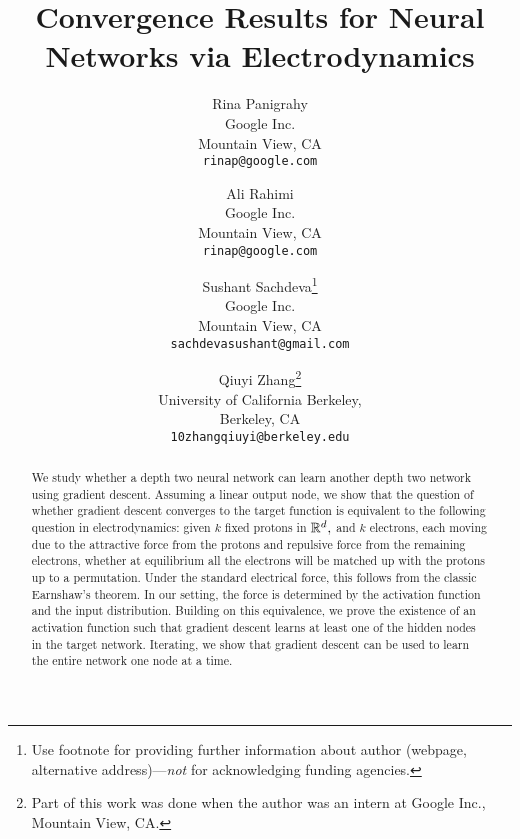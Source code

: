 \documentclass[11pt]{article}
\title{
Convergence Results for Neural Networks
 via Electrodynamics
}
\author{
Rina Panigrahy \\
Google Inc. \\
Mountain View, CA\\
\texttt{rinap@google.com}
\and
Ali Rahimi \\
Google Inc. \\
Mountain View, CA\\
\texttt{rinap@google.com}
\and
 Sushant Sachdeva\thanks{Use footnote for providing further
    information about author (webpage, alternative
    address)---\emph{not} for acknowledging funding agencies.}  \\
Google Inc. \\
Mountain View, CA \\
\texttt{sachdevasushant@gmail.com}  
\and
Qiuyi Zhang\thanks{Part of this work was done when the author was
an intern at Google Inc., Mountain View, CA.}  \\
University of California Berkeley, \\
Berkeley, CA \\
\texttt{10zhangqiuyi@berkeley.edu}
}
\begin{document}
 

\maketitle

\begin{abstract} 
We study whether a depth two neural network can learn another 
depth two network using gradient descent.
Assuming a linear output node,
we show that
the question of whether gradient descent converges to the 
target function is equivalent to the following question in
electrodynamics: 
given $k$ fixed protons in $\mathbb R^d,$ and $k$ electrons,
each moving due to the attractive force from the protons and repulsive
force from the remaining electrons,
whether at equilibrium all the electrons will be matched up with 
the protons up to a permutation. 
Under the standard electrical
force, this follows from the classic Earnshaw's theorem. In our setting,
the force  is 
determined by the activation function and the
input distribution.  
Building on this equivalence, we prove the
existence of an activation function such that 
gradient descent learns
at least one of the
hidden nodes in the target network. 
Iterating, we show that gradient
descent can be used to learn the entire network one node at a time.
\end{abstract} 








\end{document}
